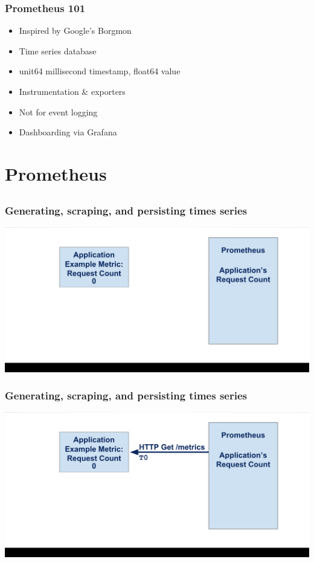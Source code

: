 \documentclass[aspectratio=169]{beamer}
\begin{document}
\begin{frame}
	\frametitle{Prometheus 101}
	\begin{itemize}
		\item Inspired by Google's Borgmon
		\item Time series database
		\item unit64 millisecond timestamp, float64 value
		\item Instrumentation \& exporters
		\item Not for event logging
		\item Dashboarding via Grafana
	\end{itemize}
\end{frame}


\section{Prometheus}


\subsection{}

\begin{frame}
        \frametitle{Generating, scraping, and persisting times series}
        \includegraphics[width=\textwidth]{01-cropped.png}
\end{frame}

\begin{frame}
        \frametitle{Generating, scraping, and persisting times series}
        \includegraphics[width=\textwidth]{02-cropped.png}
\end{frame}
\end{document}
